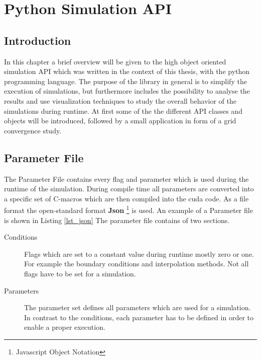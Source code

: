 \chapter{Python Simulation API}

\section{Introduction}

In this chapter a brief overview will be given to the high object oriented simulation API which
was written in the context of this thesis, with the python programming language.
The purpose of the library in general is to simplify the execution of simulations, but furthermore
includes the possibility to analyse the results and use visualization techniques to study the overall
behavior of the simulations during runtime.
At first some of the the different API classes and objects will be introduced,
followed by a small application in form of a grid convergence study.

\section{Parameter File}

The Parameter File contains every flag and parameter which is used during the runtime of the simulation.
During compile time all parameters are converted into a specific set of C-macros which are then compiled
into the cuda code. As a file format the open-standard format \textbf{Json} \footnote{Javascript Object Notation} is used.
An example of a Parameter file is shown in Listing \ref{lst_json}
The parameter file contains of two sections.

\begin{description}
\item[Conditions] Flags which are set to a constant value during runtime mostly zero or one. For example the boundary conditions and
                  interpolation methods. Not all flags have to be set for a simulation.
\item[Parameters] The parameter set defines all parameters which are used  for a simulation. In contrast to the conditions, each
                  parameter has to be defined in order to enable a proper execution.
\end{description}

